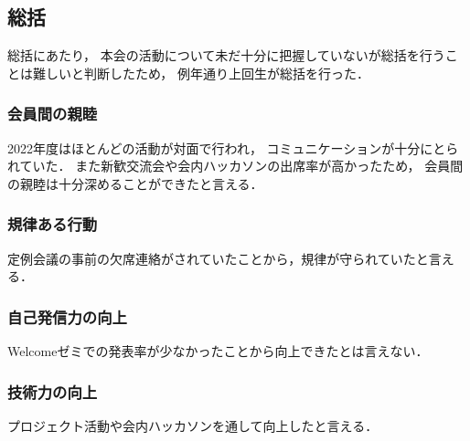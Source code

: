 \subsection*{\firstGrade{}総括}


\firstGrade{}総括にあたり，
本会の活動について未だ十分に把握していない\firstGrade{}が総括を行うことは難しいと判断したため，
例年通り上回生が総括を行った．

\subsubsection*{会員間の親睦}
2022年度はほとんどの活動が対面で行われ，
コミュニケーションが十分にとられていた．
また新歓交流会や会内ハッカソンの出席率が高かったため，
会員間の親睦は十分深めることができたと言える．

\subsubsection*{規律ある行動}
定例会議の事前の欠席連絡がされていたことから，規律が守られていたと言える．

\subsubsection*{自己発信力の向上}
Welcomeゼミでの発表率が少なかったことから向上できたとは言えない．

\subsubsection*{技術力の向上}
プロジェクト活動や会内ハッカソンを通して向上したと言える．

